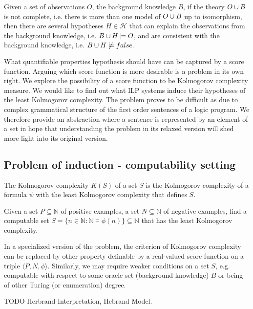 Given a set of observations $O$, the background knowledge $B$, if the theory $O \cup B$ is not complete, i.e. there is more than one model of $O \cup B$ up to isomorphism, then there are several hypotheses $H \in \mathcal{H}$ that can explain the observations from the background knowledge, i.e. $B \cup H \models O$, and are consistent with the background knowledge, i.e. $B \cup H \not\models false$.

What quantifiable properties hypothesis should have can be captured by a score function. Arguing which score function is more desirable is a problem in its own right. We explore the possibility of a score function to be Kolmogorov complexity measure. We would like to find out what ILP systems induce their hypotheses of the least Kolmogorov complexity. The problem proves to be difficult as due to complex grammatical structure of the first order sentences of a logic program. We therefore provide an abstraction where a sentence is represented by an element of a set in hope that understanding the problem in its relaxed version will shed more light into its original version.

\subsection{Problem of induction - computability setting}

\begin{defn}
The Kolmogorov complexity $K(S)$ of a set $S$ is the Kolmogorov complexity
of a formula $\psi$ with the least Kolmogorov complexity that defines $S$.
\end{defn}

Given a set $P \subseteq \mathbb{N}$ of positive examples,
a set $N \subseteq \mathbb{N}$ of negative examples,
find a computable set $S = \{n \in \mathbb{N} : \mathbb{N} \models \phi(n) \} \subseteq \mathbb{N}$ that has the least Kolmogorov complexity.

In a specialized version of the problem, the criterion of Kolmogorov complexity can be replaced by other property definable by a real-valued score function on a triple $\langle P, N, \phi \rangle$. Similarly, we may require weaker conditions on a set $S$, e.g. computable with respect to some oracle set (background knowledge) $B$ or being of other Turing (or enumeration) degree.

\begin{defn}
TODO Herbrand Interpretation, Hebrand Model.
\end{defn}

